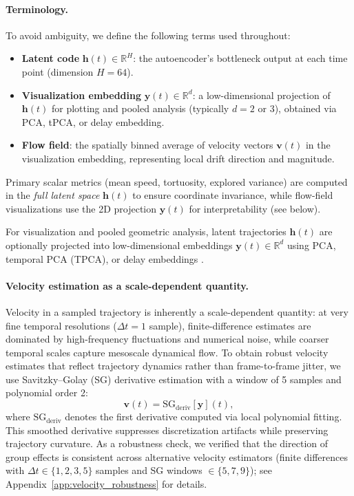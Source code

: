 \documentclass[5p,twocolumn,authoryear]{elsarticle}
\begin{document}
\paragraph{Terminology.}
To avoid ambiguity, we define the following terms used throughout:
\begin{itemize}
    \item \textbf{Latent code} $\mathbf{h}(t) \in \mathbb{R}^{H}$: the autoencoder's bottleneck output at each time point (dimension $H=64$).
    \item \textbf{Visualization embedding} $\mathbf{y}(t) \in \mathbb{R}^{d}$: a low-dimensional projection of $\mathbf{h}(t)$ for plotting and pooled analysis (typically $d=2$ or $3$), obtained via PCA, tPCA, or delay embedding.
    \item \textbf{Flow field}: the spatially binned average of velocity vectors $\mathbf{v}(t)$ in the visualization embedding, representing local drift direction and magnitude.
\end{itemize}
Primary scalar metrics (mean speed, tortuosity, explored variance) are computed in the \emph{full latent space} $\mathbf{h}(t)$ to ensure coordinate invariance, while flow-field visualizations use the 2D projection $\mathbf{y}(t)$ for interpretability (see below).

For visualization and pooled geometric analysis, latent trajectories $\mathbf{h}(t)$ are optionally projected into low-dimensional embeddings $\mathbf{y}(t) \in \mathbb{R}^d$ using PCA, temporal PCA (TPCA), or delay embeddings \citep{Takens1981,Sauer1991}.

\paragraph{Velocity estimation as a scale-dependent quantity.}
Velocity in a sampled trajectory is inherently a scale-dependent quantity: at very fine temporal resolutions ($\Delta t = 1$ sample), finite-difference estimates are dominated by high-frequency fluctuations and numerical noise, while coarser temporal scales capture mesoscale dynamical flow. To obtain robust velocity estimates that reflect trajectory dynamics rather than frame-to-frame jitter, we use Savitzky--Golay (SG) derivative estimation \citep{SavitzkyGolay1964} with a window of 5 samples and polynomial order 2:
\begin{equation}
\mathbf{v}(t) = \mathrm{SG}_{\mathrm{deriv}}[\mathbf{y}](t),
\end{equation}
where $\mathrm{SG}_{\mathrm{deriv}}$ denotes the first derivative computed via local polynomial fitting. This smoothed derivative suppresses discretization artifacts while preserving trajectory curvature. As a robustness check, we verified that the direction of group effects is consistent across alternative velocity estimators (finite differences with $\Delta t \in \{1, 2, 3, 5\}$ samples and SG windows $\in \{5, 7, 9\}$); see Appendix~\ref{app:velocity_robustness} for details.
\end{document}
